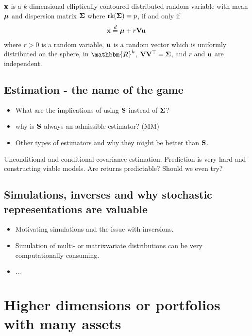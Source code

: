 \documentclass[]{book}\usepackage{knitr}
\begin{document}
\begin{lemma}\label{lem:stoc_rep}
	$\mathbf{x}$ is a $k$ dimensional elliptically contoured distributed random variable with mean $\mbox{\boldmath$\mu$}$ and dispersion matrix $\mathbf{\Sigma}$ where $\text{rk} (\mathbf{\Sigma}) = p$, if and only if 
	$$
	\mathbf{x} \stackrel{d}{=} \mbox{\boldmath$\mu$} + r \mathbf{V} \mathbf{u}
	$$
	where $r >0$ is a random variable, $\mathbf{u}$ is a random vector which is uniformly distributed on the sphere, in $\mathbbm{R}^k$, $\mathbf{V}\mathbf{V}^\top=\mathbf{\Sigma}$, and $r$ and $\mathbf{u}$ are independent.
\end{lemma}

\section{Estimation - the name of the game}

\begin{itemize}
	\item What are the implications of using $\mathbf{S}$ instead of $\mathbf{\Sigma}$?
	\item why is $\mathbf{S}$  always an admissible estimator? (MM)
	\item Other types of estimators and why they might be better than $\mathbf{S}$.
\end{itemize}

\begin{remark}
	Unconditional and conditional covariance estimation. Prediction is very hard and constructing viable models. Are returns predictable? Should we even try?
\end{remark}

\section{Simulations, inverses and why stochastic representations are valuable}
\begin{itemize}
	\item Motivating simulations and the issue with inversions.
	\item Simulation of multi- or matrixvariate distributions can be very computationally consuming.
	\item ...
\end{itemize}
\chapter{Higher dimensions or portfolios with many assets}\label{ch:highdim}
\end{document}
